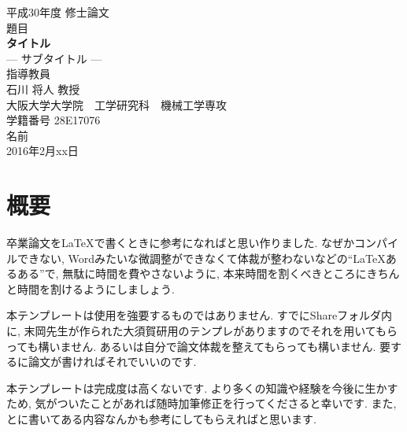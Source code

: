 \begin{titlepage}
\centering
\vspace*{40truept}
{\Large 平成30年度 修士論文} \\ %
\vspace{40truept} 
 {\Large 題目} \\
 \vspace{10truept} 
{\LARGE \textbf{タイトル}}\\ %
\vspace{10truept}
{\Large --- サブタイトル ---}\\ %
\vspace{120truept}
{\Large 指導教員}\\ %
 \vspace{10truept} 
{\Large 石川 将人 教授}\\ %
\vspace{60truept}
{\Large 大阪大学大学院　工学研究科　機械工学専攻}\\ %
 \vspace{10truept} 
{\Large 学籍番号 28E17076}\\ %
\vspace{20truept}
{\LARGE 名前}\\ %
\vspace{80truept}
{\Large 2016年2月xx日} %
\end{titlepage}
\cleardoublepage
\chapter*{\huge 概要}
\Cvs

卒業論文を\LaTeX で書くときに参考になればと思い作りました. なぜかコンパイルできない, Wordみたいな微調整ができなくて体裁が整わないなどの``\LaTeX あるある''で, 無駄に時間を費やさないように, 本来時間を割くべきところにきちんと時間を割けるようにしましょう. 

本テンプレートは使用を強要するものではありません. すでにShareフォルダ内に, 末岡先生が作られた大須賀研用のテンプレがありますのでそれを用いてもらっても構いません. あるいは自分で論文体裁を整えてもらっても構いません. 要するに論文が書ければそれでいいのです. 

本テンプレートは完成度は高くないです. より多くの知識や経験を今後に生かすため, 気がついたことがあれば随時加筆修正を行ってくださると幸いです. また, とに書いてある内容なんかも参考にしてもらえればと思います. 

